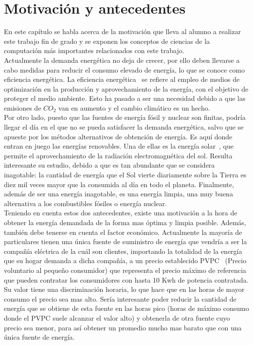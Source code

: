 \chapter{Motivación y antecedentes}
\label{cap:Antecedentes}
En este capítulo se habla acerca de la motivación que lleva al alumno a realizar este trabajo fin de grado y se exponen los conceptos de ciencias de la computación más importantes relacionados con este trabajo.\\

Actualmente la demanda energética no deja de crecer, por ello deben llevarse a cabo medidas para reducir el consumo elevado de energía, lo que se conoce como eficiencia energética. La eficiencia energética~\cite{GarSa12} se refiere al empleo de medios de optimización en la producción y aprovechamiento de la energía, con el objetivo de proteger el medio ambiente. Esto ha pasado a ser una necesidad debido a que las emisiones de $ CO_{2} $ van en aumento y el cambio climático es un hecho.\\

Por otro lado, puesto que las fuentes de energía fósil y nuclear son finitas, podría llegar el día en el que no se pueda satisfacer la demanda energética, salvo que se apueste por los métodos alternativos de obtención de energía. Es aquí donde entran en juego las energías renovables. Una de ellas es la energía solar~\cite{Perp12}, que permite el aprovechamiento de la radiación electromagnética del sol. Resulta interesante su estudio, debido a que es tan abundante que se considera inagotable: la cantidad de energía que el Sol vierte diariamente sobre la Tierra es diez mil veces mayor que la consumida al día en todo el planeta. Finalmente, además de ser una energía inagotable, es una energía limpia, una muy buena alternativa a los combustibles fósiles o energía nuclear. \\

Teniendo en cuenta estos dos antecedentes, existe una motivación a la hora de obtener la energía demandada de la forma mas óptima y limpia posible. Además, también debe tenerse en cuenta el factor económico. Actualmente la mayoría de particulares tienen una única fuente de suministro de energía que vendría a ser la compañía eléctrica de la cuál son clientes, importando la totalidad de la energía que su hogar demanda a dicha compañía, a un precio establecido PVPC~\cite{Ree14} (Precio voluntario al pequeño consumidor) que representa el precio máximo de referencia que pueden contratar los consumidores con hasta 10 Kwh de potencia contratada. Su valor tiene una discriminación horaria, lo que hace que en las horas de mayor consumo el precio sea mas alto. Sería interesante poder reducir la cantidad de energía que se obtiene de esta fuente en las horas pico (horas de máximo consumo donde el PVPC suele alcanzar el valor alto) y obtenerla de otra fuente cuyo precio sea menor, para así obtener un promedio mucho mas barato que con una única fuente de energía.\\

